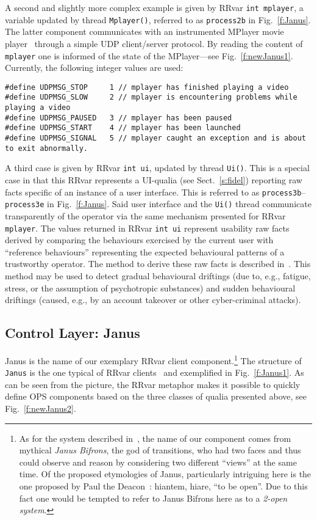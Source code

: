 \documentclass{article}
\begin{document}
A second and slightly more complex example is given by RRvar \verb"int mplayer", a variable updated
by thread \verb"Mplayer()", referred to as \texttt{process2b} in Fig.~\ref{f:Janus}. The latter component communicates with an instrumented MPlayer movie player~\cite{Mplayer} through
a simple UDP client/server protocol. By reading the content of \verb"mplayer" one is informed of the state of the MPlayer---see Fig.~\ref{f:newJanus1}.
Currently, the following integer values are used:
\begin{verbatim}
#define UDPMSG_STOP     1 // mplayer has finished playing a video
#define UDPMSG_SLOW     2 // mplayer is encountering problems while playing a video
#define UDPMSG_PAUSED   3 // mplayer has been paused
#define UDPMSG_START    4 // mplayer has been launched
#define UDPMSG_SIGNAL   5 // mplayer caught an exception and is about to exit abnormally.
\end{verbatim}


A third case is given by RRvar \verb"int ui", updated
by thread \verb"Ui()". This is a special case in that this RRvar represents a UI-qualia (see Sect.~\ref{s:fidel})
reporting raw facts specific of an instance of a user interface. This is referred to as \texttt{process3b}--\texttt{process3e} in Fig.~\ref{f:Janus}.
Said user interface and the 
\verb"Ui()" thread communicate transparently of the operator via the same mechanism presented for
RRvar \verb"mplayer". The values returned in RRvar \verb"int ui" represent usability raw facts
derived by comparing the behaviours exercised by the current user with ``reference behaviours''
representing the expected behavioural patterns of a trustworthy operator. The method to derive
these raw facts is described in~\cite{DFB12b,VD13}. This method may be used
to detect gradual behavioural driftings (due to, e.g., fatigue, stress, or the assumption of psychotropic substances) and sudden behavioural driftings (caused, e.g., by an account takeover or other cyber-criminal attacks).




\subsection{Control Layer: Janus}\label{s:janus:janus}

Janus is the name of our exemplary  RRvar client component.\footnote{As for the
system described in~\cite{DeDe98}, the name of our component comes from
mythical \emph{Janus Bifrons}, the god of transitions, who had two faces and thus could observe
and reason by considering two different ``views'' at the same time. Of the proposed etymologies
of Janus, particularly intriguing here is the one proposed by Paul the Deacon~\cite{Festus}:
hiantem, hiare, ``to be open''. Due to this fact one would be tempted to refer to Janus Bifrons here as to a \emph{2-open system}.} The structure of \verb"Janus" is the one typical of RRvar clients~\cite{DB07d} and exemplified in Fig.~\ref{f:Janus1}.
As can be seen from the picture, the RRvar metaphor makes it possible to quickly define OPS components
based on the three classes of qualia presented above, see Fig.~\ref{f:newJanus2}.
\end{document}
